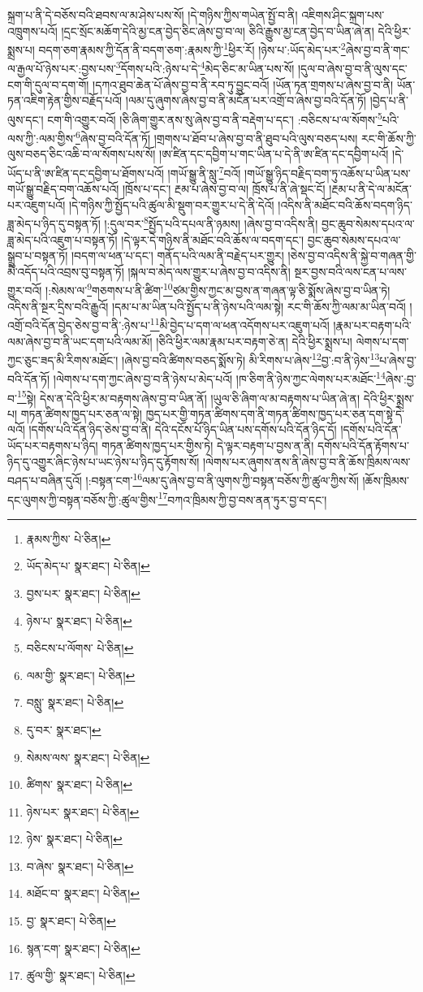 སྐྲག་པ་ནི་དེ་བཅོས་བའི་ཐབས་ལ་མ་ཤེས་པས་སོ། །དེ་གཉིས་ཀྱིས་གཡེན་སྤྱོ་བ་ནི། འཇིགས་ཤིང་སྐྲག་པས་འཁྲུགས་པའོ། །དྲང་སྲོང་མཆོག་དེའི་མྱ་ངན་བྱེད་ཅིང་ཞེས་བྱ་བ་ལ། ཅིའི་རྒྱུས་མྱ་ངན་བྱེད་བ་ཡིན་ཞེ་ན། དེའི་ཕྱིར་སྨྲས་པ། བདག་ཅག་རྣམས་ཀྱི་དོན་ནི་བདག་ཅག་:རྣམས་ཀྱི་\footnote{རྣམས་ཀྱིས་  པེ་ཅིན། }ཕྱིར་རོ། །ཉེས་པ་:ཡོད་མེད་པར་\footnote{ཡོད་མེད་པ་  སྣར་ཐང་།  པེ་ཅིན། }ཞེས་བྱ་བ་ནི་གང་ལ་རྒྱལ་པོ་ཉེས་པར་:བྱས་པས་\footnote{བྱས་པར་  སྣར་ཐང་།  པེ་ཅིན། }དོགས་པའི་:ཉེས་པ་དེ་\footnote{ཉེས་པ་  སྣར་ཐང་།  པེ་ཅིན། }མེད་ཅིང་མ་ཡིན་པས་སོ། །དུལ་བ་ཞེས་བྱ་བ་ནི་ལུས་དང་ངག་གི་དུལ་བ་དག་གོ། །དཀའ་ཐུབ་ཆེན་པོ་ཞེས་བྱ་བ་ནི་རབ་ཏུ་བྱུང་བའོ། །ཡོན་ཏན་གྲགས་པ་ཞེས་བྱ་བ་ནི། ཡོན་ཏན་འཇིག་རྟེན་གྱིས་བརྗོད་པའོ། །ལམ་དུ་ཞུགས་ཞེས་བྱ་བ་ནི་མངོན་པར་འགྲོ་བ་ཞེས་བྱ་བའི་དོན་ཏོ། །བྱེད་པ་ནི་ལུས་དང་། ངག་གི་འགྱུར་བའོ། །ཅི་ཞིག་གྱུར་ནས་སུ་ཞེས་བྱ་བ་ནི་བརྡེག་པ་དང་། :བཅིངས་པ་ལ་སོགས་\footnote{བཅིངས་པ་ལོགས་  པེ་ཅིན། }པའི་ལས་ཀྱི་:ལམ་གྱིས་\footnote{ལམ་གྱི་  སྣར་ཐང་།  པེ་ཅིན། }ཞེས་བྱ་བའི་དོན་ཏོ། །གྲགས་པ་ཐོབ་པ་ཞེས་བྱ་བ་ནི་ཐུབ་པའི་ལུས་བཅད་པས། རང་གི་ཆོས་ཀྱི་ལུས་བཅད་ཅིང་འཆི་བ་ལ་སོགས་པས་སོ། །ཨ་ཛིན་དང་དབྱིག་པ་གང་ཡིན་པ་དེ་ནི་ཨ་ཛིན་དང་དབྱིག་པའོ། །དེ་ཡོད་པ་ནི་ཨ་ཛིན་དང་དབྱིག་པ་ཐོགས་པའོ། །གཡོ་སྒྱུ་ནི་སླུ་\footnote{བསླུ་  སྣར་ཐང་།  པེ་ཅིན། }བའོ། །གཡོ་སྒྱུ་ཉིད་བརྗིད་བག་ཏུ་འཆོས་པ་ཡིན་པས་གཡོ་སྒྱུ་བརྗིད་བག་འཆོས་པའོ། །ཁྲོས་པ་དང་། རྔམ་པ་ཞེས་བྱ་བ་ལ། ཁྲོས་པ་ནི་ཞེ་སྡང་ངོ། །རྔམ་པ་ནི་དེ་ལ་མངོན་པར་འཇུག་པའོ། །དེ་གཉིས་ཀྱི་སྤྱོད་པའི་ཚུལ་མི་སྡུག་བར་གྱུར་པ་དེ་ནི་དེའོ། །འདིས་ནི་མཐོང་བའི་ཆོས་བདག་ཉིད་ཟླ་མེད་པ་ཉིད་དུ་བསྟན་ཏོ། །:དུལ་བར་\footnote{དུ་བར་  སྣར་ཐང་། }སྤྱོད་པའི་དཔལ་ནི་ཉམས། །ཞེས་བྱ་བ་འདིས་ནི། བྱང་ཆུབ་སེམས་དཔའ་ལ་ཟླ་མེད་པའི་འཇུག་པ་བསྟན་ཏོ། །དེ་ལྟར་དེ་གཉིས་ནི་མཐོང་བའི་ཆོས་ལ་བདག་དང་། བྱང་ཆུབ་སེམས་དཔའ་ལ་སྒྲུབ་པ་བསྟན་ཏོ། །བདག་ལ་ཕན་པ་དང་། གནོད་པའི་ལམ་ནི་བརྗེད་པར་གྱུར། །ཅེས་བྱ་བ་འདིས་ནི་སྐྱེ་བ་གཞན་གྱི་མི་འདོད་པའི་འབྲས་བུ་བསྟན་ཏོ། །སྐལ་བ་མེད་ལས་གྱུར་པ་ཞེས་བྱ་བ་འདིས་ནི། སྔར་བྱས་བའི་ལས་ངན་པ་ལས་གྱུར་བའོ། །:སེམས་ལ་\footnote{སེམས་ལས་  སྣར་ཐང་།  པེ་ཅིན། }གཅགས་པ་ནི་ཚིག་\footnote{ཚིགས་  སྣར་ཐང་།  པེ་ཅིན། }ཙམ་གྱིས་ཀྱང་མ་བྱས་ན་གཞན་ལྟ་ཅི་སྨོས་ཞེས་བྱ་བ་ཡིན་ཏེ། འདིས་ནི་སྔར་དྲིས་བའི་རྒྱུའོ། །དམ་པ་མ་ཡིན་པའི་སྤྱོད་པ་ནི་ཉེས་པའི་ལམ་སྟེ། རང་གི་ཆོས་ཀྱི་ལམ་མ་ཡིན་བའོ། །འགྲོ་བའི་དོན་བྱེད་ཅེས་བྱ་བ་ནི་:ཉེས་པ་\footnote{ཉེས་པར་  སྣར་ཐང་།  པེ་ཅིན། }མི་བྱེད་པ་དག་ལ་ཕན་འདོགས་པར་འཇུག་པའོ། །རྣམ་པར་བརྟག་པའི་ལམ་ཞེས་བྱ་བ་ནི་ཡང་དག་པའི་ལམ་མོ། །ཅིའི་ཕྱིར་ལམ་རྣམ་པར་བརྟག་ཅེ་ན། དེའི་ཕྱིར་སྨྲས་པ། ལེགས་པ་དག་ཀྱང་ཅུང་ཟད་མི་རིགས་མཐོང་། །ཞེས་བྱ་བའི་ཚིགས་བཅད་སྨོས་ཏེ། མི་རིགས་པ་ཞེས་\footnote{ཉེས་  སྣར་ཐང་།  པེ་ཅིན། }བྱ་:བ་ནི་ཉེས་\footnote{བ་ཞེས་  སྣར་ཐང་།  པེ་ཅིན། }པ་ཞེས་བྱ་བའི་དོན་ཏོ། །ལེགས་པ་དག་ཀྱང་ཞེས་བྱ་བ་ནི་ཉེས་པ་མེད་པའོ། །ཁ་ཅིག་ནི་ཉེས་ཀྱང་ལེགས་པར་མཐོང་\footnote{མཐོང་བ་  སྣར་ཐང་།  པེ་ཅིན། }ཞེས་:བྱ་བ་\footnote{བྱ་  སྣར་ཐང་།  པེ་ཅིན། }སྟེ། དེས་ན་དེའི་ཕྱིར་མ་བརྟགས་ཞེས་བྱ་བ་ཡིན་ནོ། །ཡུལ་ཅི་ཞིག་ལ་མ་བརྟགས་པ་ཡིན་ཞེ་ན། དེའི་ཕྱིར་སྨྲས་པ། གཏན་ཚིགས་ཁྱད་པར་ཅན་ལ་སྟེ། ཁྱད་པར་གྱི་གཏན་ཚིགས་དག་ནི་གཏན་ཚིགས་ཁྱད་པར་ཅན་དག་སྟེ་དེ་ལའོ། །དགོས་པའི་དོན་ཉིད་ཅེས་བྱ་བ་ནི། དེའི་དངོས་པོ་ཉིད་ཡིན་པས་དགོས་པའི་དོན་ཉིད་དོ། །དགོས་པའི་དོན་ཡོད་པར་བརྟགས་པ་ཉིད། གཏན་ཚིགས་ཁྱད་པར་གྱིས་ཏེ། དེ་ལྟར་བརྟག་པ་བྱས་ན་ནི། དགོས་པའི་དོན་རྟོགས་པ་ཉིད་དུ་འགྱུར་ཞིང་ཉེས་པ་ཡང་ཉེས་པ་ཉིད་དུ་རྟོགས་སོ། །ལེགས་པར་ཞུགས་ནས་ནི་ཞེས་བྱ་བ་ནི་ཆོས་ཁྲིམས་ལས་བཤད་པ་བཞིན་དུའོ། །:བསྟན་ངག་\footnote{སྙན་ངག་  སྣར་ཐང་།  པེ་ཅིན། }ལམ་དུ་ཞེས་བྱ་བ་ནི་ལུགས་ཀྱི་བསྟན་བཅོས་ཀྱི་ཚུལ་ཀྱིས་སོ། །ཆོས་ཁྲིམས་དང་ལུགས་ཀྱི་བསྟན་བཅོས་ཀྱི་:ཚུལ་གྱིས་\footnote{ཚུལ་གྱི་  སྣར་ཐང་།  པེ་ཅིན། }བཀའ་ཁྲིམས་ཀྱི་བྱ་བས་ནན་ཏུར་བྱ་བ་དང་། 